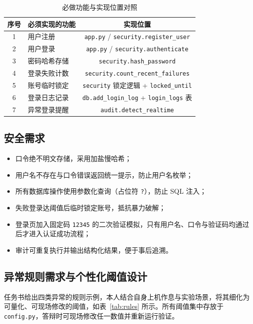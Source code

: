 \documentclass[bwprint]{report}
\begin{document}
\begin{table}[H]
    \caption{必做功能与实现位置对照}
    \label{tab:func}
    \centering
    \begin{tabular}{clc}
        \toprule[1.5pt]
        序号 & 必须实现的功能 & 实现位置 \\
        \midrule[1pt]
        1 & 用户注册 & \texttt{app.py} / \texttt{security.register\_user} \\
        2 & 用户登录 & \texttt{app.py} / \texttt{security.authenticate} \\
        3 & 密码哈希存储 & \texttt{security.hash\_password} \\
        4 & 登录失败计数 & \texttt{security.count\_recent\_failures} \\
        5 & 账号临时锁定 & \texttt{security} 锁定逻辑 + \texttt{locked\_until} \\
        6 & 登录日志记录 & \texttt{db.add\_login\_log} + \texttt{login\_logs} 表 \\
        7 & 异常登录提醒 & \texttt{audit.detect\_realtime} \\
        \bottomrule[1.5pt]
    \end{tabular}
\end{table}

\subsection{安全需求}
\begin{itemize}
    \item 口令绝不明文存储，采用加盐慢哈希；
    \item 用户名不存在与口令错误返回统一提示，防止用户名枚举；
    \item 所有数据库操作使用参数化查询（占位符 \texttt{?}），防止 SQL 注入；
    \item 失败登录达阈值后临时锁定账号，抵抗暴力破解；
    \item 登录页加入固定码 \texttt{12345} 的二次验证模拟，只有用户名、口令与验证码均通过后才进入认证成功流程；
    \item 审计可重复执行并输出结构化结果，便于事后追溯。
\end{itemize}

\subsection{异常规则需求与个性化阈值设计}
任务书给出四类异常的规则示例，本人结合自身上机作息与实验场景，将其细化为可量化、可现场修改的阈值，如表~\ref{tab:rules} 所示。所有阈值集中存放于 \texttt{config.py}，答辩时可现场修改任一数值并重新运行验证。
\end{document}
